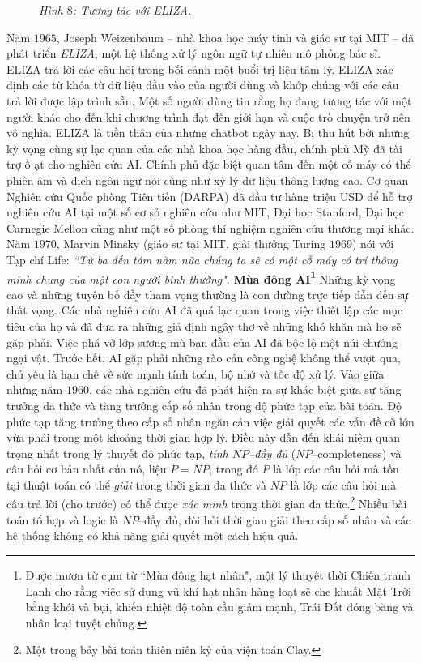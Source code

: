 \begin{multicols}{2}
\begin{figure}[H]
		\caption{\small\textit{\color{timhieukhoahoc}Hình $8$: Tương tác với ELIZA.}}
		\vspace*{-10pt}
	\end{figure}
	Năm $1965$, Joseph Weizenbaum -- nhà khoa học máy tính và giáo sư tại MIT -- đã phát triển \textit{ELIZA}, một hệ thống xử lý ngôn ngữ tự nhiên mô phỏng bác sĩ. ELIZA trả lời các câu hỏi trong bối cảnh một buổi trị liệu tâm lý. ELIZA xác định các từ khóa từ dữ liệu đầu vào của người dùng và khớp chúng với các câu trả lời được lập trình sẵn. Một số người dùng tin rằng họ đang tương tác với một người khác cho đến khi chương trình đạt đến giới hạn và cuộc trò chuyện trở nên vô nghĩa. ELIZA là tiền thân của những chatbot ngày nay.
	\vskip 0.1cm
	Bị thu hút bởi những kỳ vọng cùng sự lạc quan của các nhà khoa học hàng đầu, chính phủ Mỹ đã tài trợ ồ ạt cho nghiên cứu AI. Chính phủ đặc biệt quan tâm đến một cỗ máy có thể phiên âm và dịch ngôn ngữ nói cũng như xỷ lý dữ liệu thông lượng cao. Cơ quan Nghiên cứu Quốc phòng Tiên tiến (DARPA) đã đầu tư hàng triệu USD để hỗ trợ nghiên cứu AI tại một số cơ sở nghiên cứu như MIT, Đại học Stanford, Đại học Carnegie Mellon cũng như một số phòng thí nghiệm nghiên cứu thương mại khác. Năm $1970$, Marvin Minsky (giáo sư tại MIT, giải thưởng Turing $1969$) nói với Tạp chí Life: \textit{``Từ ba đến tám năm nữa chúng ta sẽ có một cỗ máy có trí thông minh chung của một con người bình thường"}. 
	\vskip 0.1cm
	\textbf{\color{timhieukhoahoc}Mùa đông AI\footnote{\color{timhieukhoahoc}Được mượn từ cụm từ ``Mùa đông hạt nhân", một lý thuyết thời Chiến tranh Lạnh cho rằng việc sử dụng vũ khí hạt nhân hàng loạt sẽ che khuất Mặt Trời bằng khói và bụi, khiến nhiệt độ toàn cầu giảm mạnh, Trái Đất đóng băng và nhân loại tuyệt chủng.}}
	\vskip 0.1cm
	Những kỳ vọng cao và những tuyên bố đầy tham vọng thường là con đường trực tiếp dẫn đến sự thất vọng. Các nhà nghiên cứu AI đã quá lạc quan trong việc thiết lập các mục tiêu của họ và đã đưa ra những giả định ngây thơ về những khó khăn mà họ sẽ gặp phải. Việc phá vỡ lớp sương mù ban đầu của AI đã bộc lộ một núi chướng ngại vật. 
	\vskip 0.1cm
	Trước hết, AI gặp phải những rào cản công nghệ không thể vượt qua, chủ yếu là hạn chế về sức mạnh tính toán, bộ nhớ và tốc độ xử lý. Vào giữa những năm $1960$, các nhà nghiên cứu đã phát hiện ra sự khác biệt giữa sự tăng trưởng đa thức và tăng trưởng cấp số nhân trong độ phức tạp của bài toán. Độ phức tạp tăng trưởng theo cấp số nhân ngăn cản việc giải quyết các vấn đề cỡ lớn vừa phải trong một khoảng thời gian hợp lý. Điều này dẫn đến khái niệm quan trọng nhất trong lý thuyết độ phức tạp, \textit{tính  $NP$--đầy đủ} ($NP$--completeness) và câu hỏi cơ bản nhất của nó, liệu $P = NP$, trong đó $P$ là lớp các câu hỏi mà tồn tại thuật toán có thể \textit{giải} trong thời gian đa thức và $NP$ là lớp các câu hỏi mà câu trả lời (cho trước) có thể được \textit{xác minh} trong thời gian đa thức.\footnote{\color{timhieukhoahoc}Một trong bảy bài toán thiên niên kỷ của viện toán Clay.} Nhiều bài toán tổ hợp và logic là $NP$--đầy đủ, đòi hỏi thời gian giải theo cấp số nhân và các hệ thống không có khả năng giải quyết một cách hiệu quả.

\end{multicols}
